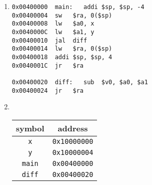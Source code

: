 \documentclass[12pt]{article}
\begin{document}
    \begin{enumerate}
        \item
        \begin{verbatim}
0x00400000  main:   addi $sp, $sp, -4
0x00400004  sw   $ra, 0($sp)
0x00400008  lw   $a0, x
0x0040000C  lw   $a1, y
0x00400010  jal  diff
0x00400014  lw   $ra, 0($sp)
0x00400018  addi $sp, $sp, 4
0x0040001C  jr   $ra

0x00400020  diff:   sub  $v0, $a0, $a1
0x00400024  jr   $ra
        \end{verbatim}

        \newpage

        \item ~
        \begin{table}[h!]
            \centering
            \begin{tabular}{|c|c|}
                \hline
                symbol & address \\
                \hline
                \texttt{x} & \texttt{0x10000000} \\
                \hline
                \texttt{y} & \texttt{0x10000004} \\
                \hline
                \texttt{main} & \texttt{0x00400000} \\
                \hline
                \texttt{diff} & \texttt{0x00400020} \\
                \hline
            \end{tabular}
        \end{table}


\end{enumerate}
\end{document}
